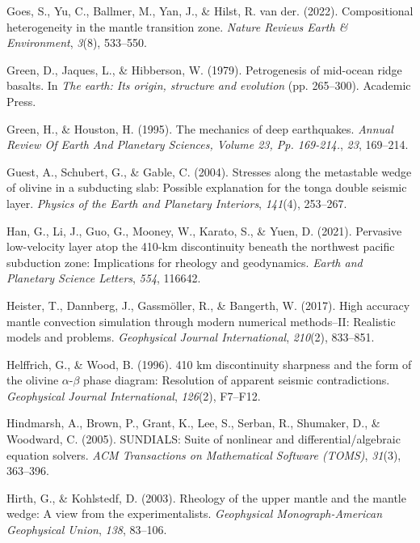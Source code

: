 \documentclass[draft,linenumbers]{agujournal2019}
\newlength{\cslhangindent}
\newenvironment{CSLReferences}[2]
 {\begin{list}{}{
  \setlength{\itemindent}{0pt}
  \setlength{\leftmargin}{0pt}
  \setlength{\parsep}{0pt}
  \ifodd #1
   \setlength{\leftmargin}{\cslhangindent}
   \setlength{\itemindent}{-\cslhangindent}
  \fi
  \setlength{\itemsep}{#2\baselineskip}
  }
  \item\relax}
 {\end{list}}
\begin{document}
\begin{CSLReferences}{1}{0}
Goes, S., Yu, C., Ballmer, M., Yan, J., \& Hilst, R. van der. (2022).
Compositional heterogeneity in the mantle transition zone. \emph{Nature
Reviews Earth \& Environment}, \emph{3}(8), 533--550.

Green, D., Jaques, L., \& Hibberson, W. (1979). Petrogenesis of
mid-ocean ridge basalts. In \emph{The earth: Its origin, structure and
evolution} (pp. 265--300). Academic Press.

Green, H., \& Houston, H. (1995). The mechanics of deep earthquakes.
\emph{Annual Review Of Earth And Planetary Sciences, Volume 23, Pp.
169-214.}, \emph{23}, 169--214.

Guest, A., Schubert, G., \& Gable, C. (2004). Stresses along the
metastable wedge of olivine in a subducting slab: Possible explanation
for the tonga double seismic layer. \emph{Physics of the Earth and
Planetary Interiors}, \emph{141}(4), 253--267.

Han, G., Li, J., Guo, G., Mooney, W., Karato, S., \& Yuen, D. (2021).
Pervasive low-velocity layer atop the 410-km discontinuity beneath the
northwest pacific subduction zone: Implications for rheology and
geodynamics. \emph{Earth and Planetary Science Letters}, \emph{554},
116642.

Heister, T., Dannberg, J., Gassmöller, R., \& Bangerth, W. (2017). High
accuracy mantle convection simulation through modern numerical
methods--II: Realistic models and problems. \emph{Geophysical Journal
International}, \emph{210}(2), 833--851.

Helffrich, G., \& Wood, B. (1996). 410 km discontinuity sharpness and
the form of the olivine \(\alpha\)-\(\beta\) phase diagram: Resolution
of apparent seismic contradictions. \emph{Geophysical Journal
International}, \emph{126}(2), F7--F12.

Hindmarsh, A., Brown, P., Grant, K., Lee, S., Serban, R., Shumaker, D.,
\& Woodward, C. (2005). SUNDIALS: Suite of nonlinear and
differential/algebraic equation solvers. \emph{ACM Transactions on
Mathematical Software (TOMS)}, \emph{31}(3), 363--396.

Hirth, G., \& Kohlstedf, D. (2003). Rheology of the upper mantle and the
mantle wedge: A view from the experimentalists. \emph{Geophysical
Monograph-American Geophysical Union}, \emph{138}, 83--106.


\end{CSLReferences}
\end{document}
